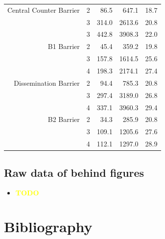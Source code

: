 \documentclass[a4paper, 10pt]{article}
\def \todo{\textbf{\textcolor{yellow}{TODO}}}
\begin{document}
\begin{table}[htbp]
\begin{tabular}{r | r | r r r}
		\arrayrulecolor{lightgray}\hline\arrayrulecolor{black}
		Central Counter Barrier   & 2      &     86.5 &     647.1 & 18.7 \\
		                          & 3      &    314.0 &    2613.6 & 20.8 \\
		                          & 3      &    442.8 &    3908.3 & 22.0 \\
		\arrayrulecolor{lightgray}\hline\arrayrulecolor{black}
		B1 Barrier                & 2      &     45.4 &     359.2 & 19.8 \\
		                          & 3      &    157.8 &    1614.5 & 25.6 \\
		                          & 4      &    198.3 &    2174.1 & 27.4 \\
		\arrayrulecolor{lightgray}\hline\arrayrulecolor{black}
		Dissemination Barrier     & 2      &     94.4 &     785.3 & 20.8 \\
		                          & 3      &    297.4 &    3189.0 & 26.8 \\
		                          & 4      &    337.1 &    3960.3 & 29.4 \\
		\arrayrulecolor{lightgray}\hline\arrayrulecolor{black}
		B2 Barrier                & 2      &     34.3 &     285.9 & 20.8 \\
		                          & 3      &    109.1 &    1205.6 & 27.6 \\
		                          & 4      &    112.1 &    1297.0 & 28.9 \\
	\end{tabular}
\end{table}

\clearpage
\subsection{Raw data of behind figures}
\begin{itemize}
	\item \todo
\end{itemize}

\pagebreak
\section{Bibliography}
\label{sec:bibliography}
\renewcommand\refname{\vskip -1cm} %
\nocite{*} %

{}
\end{document}
